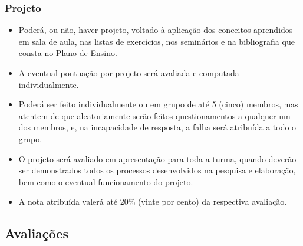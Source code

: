 \begin{frame}[t]\frametitle{Projeto}

  \begin{itemize}
    \justifying{}
    \setlength\itemsep{1em}
    \item Poderá, ou não, haver projeto, voltado à aplicação dos conceitos aprendidos em sala de aula, nas listas de exercícios, nos seminários e na bibliografia que consta no Plano de Ensino.
    \item A eventual pontuação por projeto será avaliada e computada individualmente.
    \item Poderá ser feito individualmente ou em grupo de até 5 (cinco) membros, mas atentem de que aleatoriamente serão feitos questionamentos a qualquer um dos membros, e, na incapacidade de resposta, a falha será atribuída a todo o grupo.
    \item O projeto será avaliado em apresentação para toda a turma, quando deverão ser demonstrados todos os processos desenvolvidos na pesquisa e elaboração, bem como o eventual funcionamento do projeto.
    \item A nota atribuída valerá até 20\% (vinte por cento) da respectiva avaliação.
  \end{itemize}

\end{frame}



\subsection[Avaliações]{Avaliações}\label{subsec:planejamento-avaliacoes}



